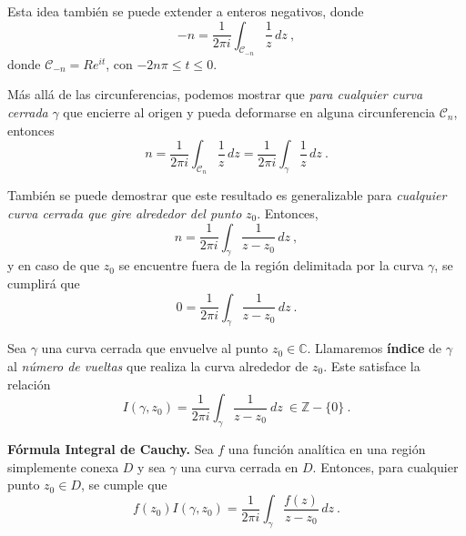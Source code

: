 Esta idea también se puede extender a enteros negativos, donde 
\begin{equation}
    -n = \frac{1}{2\pi i} \int_{\mathcal{C}_{-n}} \frac{1}{z} \, dz \ ,
\end{equation}
donde $\mathcal{C}_{-n} = Re^{it}$, con $-2n\pi \leq t \leq 0$.

Más allá de las circunferencias, podemos mostrar que \emph{para cualquier curva cerrada} $\gamma$ que encierre al origen y pueda deformarse en alguna circunferencia $\mathcal{C}_n$, entonces 
\begin{equation}
    n = \frac{1}{2\pi i} \int_{\mathcal{C}_n} \frac{1}{z} \, dz = \frac{1}{2\pi i} \int_{\gamma} \frac{1}{z} \, dz \ .
\end{equation}

También se puede demostrar que este resultado es generalizable para \emph{cualquier curva cerrada que gire alrededor del punto} $z_0$. Entonces, 
\begin{equation*}
    n = \frac{1}{2\pi i} \int_{\gamma} \frac{1}{z-z_0} \, dz \ ,
\end{equation*} 
y en caso de que $z_0$ se encuentre fuera de la región delimitada por la curva $\gamma$, se cumplirá que 
\begin{equation*}
    0 = \frac{1}{2\pi i} \int_{\gamma} \frac{1}{z-z_0} \, dz \ .
\end{equation*}

\begin{defi} 
    Sea $\gamma$ una curva cerrada que envuelve al punto $z_0 \in \mathbb{C}$. Llamaremos \textbf{índice} de $\gamma$ al \emph{número de vueltas} que realiza la curva alrededor de $z_0$. Este satisface la relación 
    \begin{equation}
        I(\gamma, z_0) = \frac{1}{2\pi i} \int_{\gamma} \frac{1}{z-z_0} \ dz \ \in \mathbb{Z}-\{0\} \ .
    \end{equation}
\end{defi}

\begin{teorema}{\textbf{Fórmula Integral de Cauchy.}} 
    Sea $f$ una función analítica en una región simplemente conexa $D$ y sea $\gamma$ una curva cerrada en $D$. Entonces, para cualquier punto $z_0 \in D$, se cumple que 
    \begin{equation}
        f(z_0) I(\gamma, z_0) = \frac{1}{2\pi i} \int_\gamma \frac{f(z)}{z-z_0} \, dz \ .
    \end{equation}
\end{teorema}

